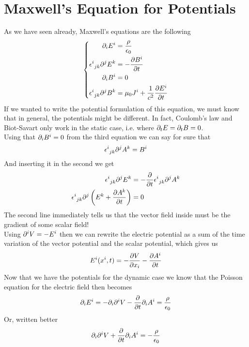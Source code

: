 \documentclass[../electromagnetism.tex]{subfiles}
\begin{document}
\section{Maxwell's Equation for Potentials}
As we have seen already, Maxwell's equations are the following
\begin{equation}
	\left\{ \begin{aligned}
			\partial_iE^i&=\frac{\rho}{\epsilon_0}\\
			\epsilon^{i}_{\ jk}\partial^jE^k&=-\pdv{B^i}{t}\\
			\partial_iB^i&=0\\
			\epsilon^{i}_{\ jk}\partial^jB^k&=\mu_0J^i+\frac{1}{c^2}\pdv{E^i}{t}
	\end{aligned}\right.
	\label{eq:maxwellpotentialchapter}
\end{equation}
If we wanted to write the potential formulation of this equation, we must know that in general, the potentials might be different. In fact, Coulomb's law and Biot-Savart only work in the static case, i.e. where $\partial_tE=\partial_tB=0$.\\
Using that $\partial_iB^i=0$ from the third equation we can say for sure that
\begin{equation*}
	\epsilon^{i}_{\ jk}\partial^jA^k=B^i
\end{equation*}
And inserting it in the second we get
\begin{equation*}
	\begin{aligned}
		\epsilon^{i}_{\ jk}\partial^jE^k&=-\pdv{t}\epsilon^{i}_{\ jk}\partial^jA^k\\
		\epsilon^{i}_{\ jk}\partial^j\left( E^k+\pdv{A^k}{t} \right)&=0
	\end{aligned}
\end{equation*}
The second line immediately tells us that the vector field inside must be the gradient of some scalar field!\\
Using $\partial^iV=-E^i$ then we can rewrite the electric potential as a sum of the time variation of the vector potential and the scalar potential, which gives us
\begin{equation}
	E^i(x^i,t)=-\pdv{V}{x_i}-\pdv{A^i}{t}
	\label{eq:electric-dynamicpotential}
\end{equation}
Now that we have the potentials for the dynamic case we know that the Poisson equation for the electric field then becomes
\begin{equation*}
	\partial_iE^i=-\partial_i\partial^iV-\pdv{t}\partial_iA^i=\frac{\rho}{\epsilon_0}
\end{equation*}
Or, written better
\begin{equation}
	\partial_i\partial^iV+\pdv{t}\partial_iA^i=-\frac{\rho}{\epsilon_0}
	\label{eq:poissondynamiceq-V}
\end{equation}
\end{document}
